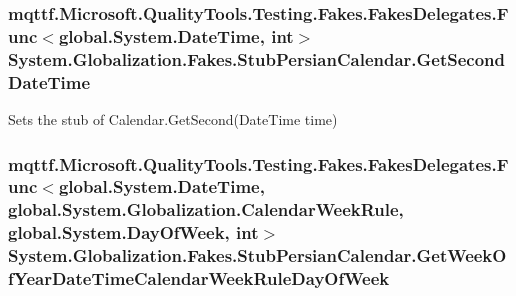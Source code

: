 \hypertarget{class_system_1_1_globalization_1_1_fakes_1_1_stub_persian_calendar_af12dd55dc341d844a83f21c2dc84b7ac}{
\subsubsection[{Get\-Second\-Date\-Time}]{\setlength{\rightskip}{0pt plus 5cm}mqttf.\-Microsoft.\-Quality\-Tools.\-Testing.\-Fakes.\-Fakes\-Delegates.\-Func$<$global.\-System.\-Date\-Time, int$>$ System.\-Globalization.\-Fakes.\-Stub\-Persian\-Calendar.\-Get\-Second\-Date\-Time}}\label{class_system_1_1_globalization_1_1_fakes_1_1_stub_persian_calendar_af12dd55dc341d844a83f21c2dc84b7ac}


Sets the stub of Calendar.\-Get\-Second(\-Date\-Time time)

\hypertarget{class_system_1_1_globalization_1_1_fakes_1_1_stub_persian_calendar_a595e80d4141605a1f3f741a6c4f83430}{
\subsubsection[{Get\-Week\-Of\-Year\-Date\-Time\-Calendar\-Week\-Rule\-Day\-Of\-Week}]{\setlength{\rightskip}{0pt plus 5cm}mqttf.\-Microsoft.\-Quality\-Tools.\-Testing.\-Fakes.\-Fakes\-Delegates.\-Func$<$global.\-System.\-Date\-Time, global.\-System.\-Globalization.\-Calendar\-Week\-Rule, global.\-System.\-Day\-Of\-Week, int$>$ System.\-Globalization.\-Fakes.\-Stub\-Persian\-Calendar.\-Get\-Week\-Of\-Year\-Date\-Time\-Calendar\-Week\-Rule\-Day\-Of\-Week}}\label{class_system_1_1_globalization_1_1_fakes_1_1_stub_persian_calendar_a595e80d4141605a1f3f741a6c4f83430}


